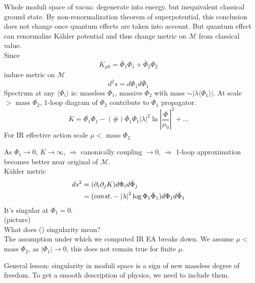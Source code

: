 \documentclass[type = bachelor]{fduthesis-en}
\begin{document}
Whole moduli space of vacua: degenerate into energy, but inequivalent classical ground state. By non-renormalization theorem of superpotential, this conclusion does not change once quantum effects are taken into account. But quantum effect can renormalize K\"{a}hler potential and thus change metric on $\mathcal{M}$ from classical value.\\
Since
\begin{equation}
K_{\mu0}=\bar{\Phi}_1\Phi_1+\bar{\Phi}_2\Phi_2
\end{equation}
induce metric on $\mathcal{M}$
\begin{equation}
d^2s=d\Phi_1d\bar{\Phi}_1
\end{equation}
Spectrum at any $\langle\Phi_i\rangle$ is: massless $\Phi_1$, massive $\Phi_2$ with mass $\sim\left|\lambda\langle\Phi_1\rangle\right|$. At scale $>$ mass $\Phi_2$, 1-loop diagram of $\Phi_2$ contribute to $\Phi_1$ propagator.
\begin{equation}
K=\bar{\Phi_1}\Phi_1-(\#)\bar{\Phi}_1\Phi_1\left|\lambda\right|^2\ln\left|\frac{\Phi}{\mu_0}\right|^2+...
\end{equation}
For IR effective action scale $\mu<$ mass $\Phi_2$

As $\Phi_1\rightarrow0$, $K\rightarrow\infty$, $\Rightarrow$ canonically coupling $\rightarrow0$, $\Rightarrow$ 1-loop approximation becomes better near original of $\mathcal{M}$.\\
K\"{a}hler metric 
\begin{align}
\notag ds^2&=(\partial_i\partial_jK)d\Phi_id\bar{\Phi}_j\\
&=(const.-\left|\lambda\right|^2\log\Phi_1\bar{\Phi}_1)d\Phi_1d\bar{\Phi}_1
\end{align} 
It's singular at $\Phi_1=0$.
\\(picture)
\\What does () singularity mean?
\\The assumption under which we computed IR EA breaks down. We assume $\mu<$ mass $\Phi_2$, as $\left|\Phi_1\right|\rightarrow0$, this does not remain true for finite $\mu$.

General lesson: singularity in moduli space is a sign of new massless degree of freedom. To get a smooth description of physics, we need to include them.
\end{document}
